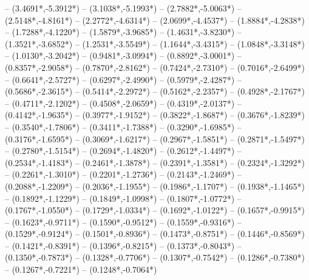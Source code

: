 {	-- ({3.4691*\dx},{-5.3912*\dy})
	-- ({3.1038*\dx},{-5.1993*\dy})
	-- ({2.7882*\dx},{-5.0063*\dy})
	-- ({2.5148*\dx},{-4.8161*\dy})
	-- ({2.2772*\dx},{-4.6314*\dy})
	-- ({2.0699*\dx},{-4.4537*\dy})
	-- ({1.8884*\dx},{-4.2838*\dy})
	-- ({1.7288*\dx},{-4.1220*\dy})
	-- ({1.5879*\dx},{-3.9685*\dy})
	-- ({1.4631*\dx},{-3.8230*\dy})
	-- ({1.3521*\dx},{-3.6852*\dy})
	-- ({1.2531*\dx},{-3.5549*\dy})
	-- ({1.1644*\dx},{-3.4315*\dy})
	-- ({1.0848*\dx},{-3.3148*\dy})
	-- ({1.0130*\dx},{-3.2042*\dy})
	-- ({0.9481*\dx},{-3.0994*\dy})
	-- ({0.8892*\dx},{-3.0001*\dy})
	-- ({0.8357*\dx},{-2.9058*\dy})
	-- ({0.7870*\dx},{-2.8162*\dy})
	-- ({0.7424*\dx},{-2.7310*\dy})
	-- ({0.7016*\dx},{-2.6499*\dy})
	-- ({0.6641*\dx},{-2.5727*\dy})
	-- ({0.6297*\dx},{-2.4990*\dy})
	-- ({0.5979*\dx},{-2.4287*\dy})
	-- ({0.5686*\dx},{-2.3615*\dy})
	-- ({0.5414*\dx},{-2.2972*\dy})
	-- ({0.5162*\dx},{-2.2357*\dy})
	-- ({0.4928*\dx},{-2.1767*\dy})
	-- ({0.4711*\dx},{-2.1202*\dy})
	-- ({0.4508*\dx},{-2.0659*\dy})
	-- ({0.4319*\dx},{-2.0137*\dy})
	-- ({0.4142*\dx},{-1.9635*\dy})
	-- ({0.3977*\dx},{-1.9152*\dy})
	-- ({0.3822*\dx},{-1.8687*\dy})
	-- ({0.3676*\dx},{-1.8239*\dy})
	-- ({0.3540*\dx},{-1.7806*\dy})
	-- ({0.3411*\dx},{-1.7388*\dy})
	-- ({0.3290*\dx},{-1.6985*\dy})
	-- ({0.3176*\dx},{-1.6595*\dy})
	-- ({0.3069*\dx},{-1.6217*\dy})
	-- ({0.2967*\dx},{-1.5851*\dy})
	-- ({0.2871*\dx},{-1.5497*\dy})
	-- ({0.2780*\dx},{-1.5154*\dy})
	-- ({0.2694*\dx},{-1.4820*\dy})
	-- ({0.2612*\dx},{-1.4497*\dy})
	-- ({0.2534*\dx},{-1.4183*\dy})
	-- ({0.2461*\dx},{-1.3878*\dy})
	-- ({0.2391*\dx},{-1.3581*\dy})
	-- ({0.2324*\dx},{-1.3292*\dy})
	-- ({0.2261*\dx},{-1.3010*\dy})
	-- ({0.2201*\dx},{-1.2736*\dy})
	-- ({0.2143*\dx},{-1.2469*\dy})
	-- ({0.2088*\dx},{-1.2209*\dy})
	-- ({0.2036*\dx},{-1.1955*\dy})
	-- ({0.1986*\dx},{-1.1707*\dy})
	-- ({0.1938*\dx},{-1.1465*\dy})
	-- ({0.1892*\dx},{-1.1229*\dy})
	-- ({0.1849*\dx},{-1.0998*\dy})
	-- ({0.1807*\dx},{-1.0772*\dy})
	-- ({0.1767*\dx},{-1.0550*\dy})
	-- ({0.1729*\dx},{-1.0334*\dy})
	-- ({0.1692*\dx},{-1.0122*\dy})
	-- ({0.1657*\dx},{-0.9915*\dy})
	-- ({0.1623*\dx},{-0.9711*\dy})
	-- ({0.1590*\dx},{-0.9512*\dy})
	-- ({0.1559*\dx},{-0.9316*\dy})
	-- ({0.1529*\dx},{-0.9124*\dy})
	-- ({0.1501*\dx},{-0.8936*\dy})
	-- ({0.1473*\dx},{-0.8751*\dy})
	-- ({0.1446*\dx},{-0.8569*\dy})
	-- ({0.1421*\dx},{-0.8391*\dy})
	-- ({0.1396*\dx},{-0.8215*\dy})
	-- ({0.1373*\dx},{-0.8043*\dy})
	-- ({0.1350*\dx},{-0.7873*\dy})
	-- ({0.1328*\dx},{-0.7706*\dy})
	-- ({0.1307*\dx},{-0.7542*\dy})
	-- ({0.1286*\dx},{-0.7380*\dy})
	-- ({0.1267*\dx},{-0.7221*\dy})
	-- ({0.1248*\dx},{-0.7064*\dy})
}
